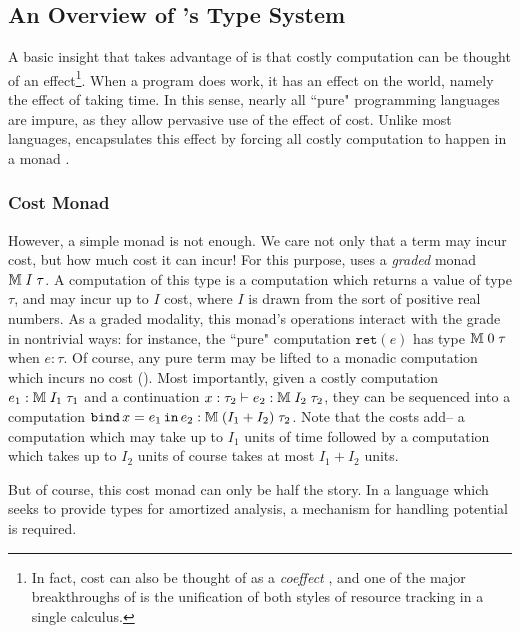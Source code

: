 \subsection{An Overview of \lambdaamor's Type System}
A basic insight that \lambdaamor takes advantage of is that costly computation can be thought of an effect\footnote{
In fact, cost can also be thought of as a \textit{coeffect} \cite{girard-et-al:tcs92:bll}, and one of the major breakthroughs of \lambdaamor is the unification
of both styles of resource tracking in a single calculus.
}. When a program does work, it has an effect on the world, namely the effect of taking time. In this sense, nearly all ``pure" programming languages are impure, as they allow pervasive use of the effect of cost. Unlike most languages, \lambdaamor encapsulates this effect by forcing all costly computation to happen in a monad \citehere.

\subsubsection{Cost Monad}
 However, a simple monad is not enough. We care not only that a term may incur cost, but how much cost it can incur! For this purpose, \lambdaamor uses a \textit{graded} monad \citehere $\mathbb{M} \; I \; \tau$. A computation of this type is a computation which returns a value of type $\tau$, and may incur up to $I$ cost, where $I$ is drawn from the sort of positive real numbers. As a graded modality, this monad's operations interact with the grade in nontrivial ways: for instance, the ``pure" computation $\texttt{ret}(e)$ has type $\mathbb{M} \; 0 \; \tau$ when $e : \tau$. Of course, any pure term may be lifted to a monadic computation which incurs no cost (). Most importantly, given a costly computation $e_1 : \mathbb{M} \; I_1 \; \tau_1$ and a continuation $x : \tau_2 \vdash e_2 : \mathbb{M} \; I_2 \; \tau_2$, they can be sequenced into a computation $\texttt{bind}\, x = e_1\, \texttt{in}\, e_2 : \mathbb{M} \; (I_1 + I_2) \; \tau_2$. Note that the costs add-- a computation which may take up to $I_1$ units of time followed by a computation which takes up to $I_2$ units of course takes at most $I_1 + I_2$ units.
 
But of course, this cost monad can only be half the story. In a language which seeks to provide types for amortized analysis, a mechanism for handling potential is required.
 
